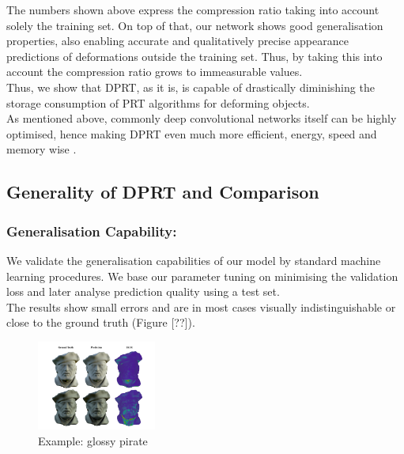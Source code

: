 The numbers shown above express the compression ratio taking into account solely the training set. On top of that, our network shows good generalisation properties, also enabling accurate and qualitatively precise appearance predictions of deformations outside the training set. Thus, by taking this into account the compression ratio grows to immeasurable values. 
\\
Thus, we show that DPRT, as it is, is capable of drastically diminishing the storage consumption of PRT algorithms for deforming objects. 
\\
As mentioned above, commonly deep convolutional networks itself can be highly optimised, hence making DPRT even much more efficient, energy, speed and memory wise \cite{Survey_NN_Compression}. 
\subsection*{Generality of DPRT and Comparison}
\subsubsection*{Generalisation Capability:}
We validate the generalisation capabilities of our model by standard machine learning procedures. We base our parameter tuning on minimising the validation loss and later analyse prediction quality using a test set.\\ 
The results show small errors and are in most cases visually indistinguishable or close to the ground truth (Figure [??]). 
\begin{figure}[H]
  \centering
    \includegraphics[width=0.35\textwidth]{Figures/glossy_pirate.pdf}
     \caption{Example: glossy pirate}
     \label{Fig: glossy_pirate}
\end{figure}
